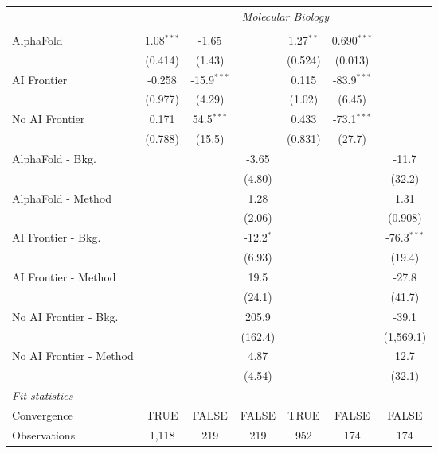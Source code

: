 \begin{tabular}{lcccccc}
 & \multicolumn{6}{c}{\textit{Molecular Biology}} \\ \\
   AlphaFold               & 1.08$^{***}$ & -1.65         &             & 1.27$^{**}$ & 0.690$^{***}$ &   \\   
                           & (0.414)      & (1.43)        &             & (0.524)     & (0.013)       &   \\   
   AI Frontier             & -0.258       & -15.9$^{***}$ &             & 0.115       & -83.9$^{***}$ &   \\   
                           & (0.977)      & (4.29)        &             & (1.02)      & (6.45)        &   \\   
   No AI Frontier          & 0.171        & 54.5$^{***}$  &             & 0.433       & -73.1$^{***}$ &   \\   
                           & (0.788)      & (15.5)        &             & (0.831)     & (27.7)        &   \\   
   AlphaFold - Bkg.        &              &               & -3.65       &             &               & -11.7\\   
                           &              &               & (4.80)      &             &               & (32.2)\\   
   AlphaFold - Method      &              &               & 1.28        &             &               & 1.31\\   
                           &              &               & (2.06)      &             &               & (0.908)\\   
   AI Frontier - Bkg.      &              &               & -12.2$^{*}$ &             &               & -76.3$^{***}$\\   
                           &              &               & (6.93)      &             &               & (19.4)\\   
   AI Frontier - Method    &              &               & 19.5        &             &               & -27.8\\   
                           &              &               & (24.1)      &             &               & (41.7)\\   
   No AI Frontier - Bkg.   &              &               & 205.9       &             &               & -39.1\\   
                           &              &               & (162.4)     &             &               & (1,569.1)\\   
   No AI Frontier - Method &              &               & 4.87        &             &               & 12.7\\   
                           &              &               & (4.54)      &             &               & (32.1)\\   
   \midrule
   \emph{Fit statistics}\\
   Convergence             &TRUE          & FALSE         & FALSE       & TRUE        & FALSE         & FALSE\\  
   Observations            & 1,118        & 219           & 219         & 952         & 174           & 174\\  
   

\end{tabular}
